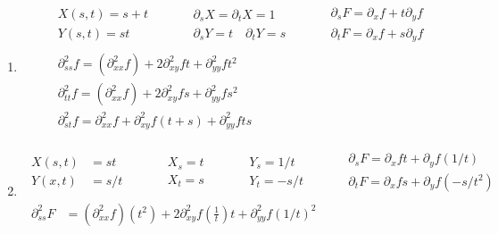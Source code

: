 \documentclass[twoside]{amsart}
\theoremstyle{plain}
\theoremstyle{definition}
\newcommand{\exercisehead}[1]
  {
   \noindent{\small\bf Exercise #1.}
   \smallskip}
\begin{document}
\exercisehead{4} \begin{enumerate}
  \item \[
\begin{gathered}
  \begin{aligned}
    & X(s,t) = s +t \\
    & Y(s,t) = st 
  \end{aligned} \quad \quad 
\begin{aligned}
  & \partial_s X = \partial_t X = 1 \\
  & \partial_s Y = t \quad \partial_t Y = s 
\end{aligned} \quad \quad 
  \begin{aligned}
    & \partial_s F = \partial_x f + t \partial_y f \\
    & \partial_t F = \partial_x f + s \partial_y f 
\end{aligned} \\
  \begin{aligned}
    & \partial_{ss}^2 f = (\partial_{xx}^2 f) + 2 \partial_{xy}^2 f t + \partial_{yy}^2 f t^2 \\ 
    & \partial_{tt}^2 f = (\partial_{xx}^2 f) + 2 \partial_{xy}^2 f s + \partial_{yy}^2 f s^2 \\
    & \partial_{st}^2 f = \partial_{xx}^2 f + \partial_{xy}^2 f(t+s) + \partial_{yy}^2 f ts 
  \end{aligned}
\end{gathered}
\]
  \item \[
\begin{gathered}
  \begin{aligned}
    X(s,t) & = st \\
    Y(x,t) & = s/t 
  \end{aligned} \quad \quad 
\begin{aligned}
  & X_s = t \\
  & X_t = s 
\end{aligned} \quad \quad 
\begin{aligned}
  & Y_s = 1/t \\ 
  & Y_t = -s/t
\end{aligned} \quad \quad 
\begin{aligned}
  & \partial_s F = \partial_x f t + \partial_y f (1/t) \\
  & \partial_t F = \partial_x f s + \partial_y f (-s/t^2) 
\end{aligned} \\
\begin{aligned}
  \partial_{ss}^2 F & = (\partial_{xx}^2 f)(t^2) + 2 \partial_{xy}^2 f \left( \frac{1}{t} \right) t + \partial_{yy}^2 f (1/t)^2 \\

\end{aligned}
\end{gathered}\]
\end{enumerate}
\end{document}
